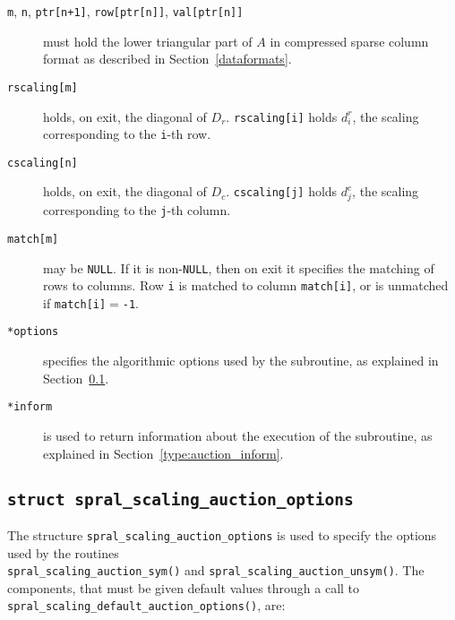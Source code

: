 \begin{description}

\item[\texttt{m}, \texttt{n}, \texttt{ptr[n+1]}, \texttt{row[ptr[n]]}, \texttt{val[ptr[n]]}] must hold the lower triangular part of $A$ in compressed sparse column format as described in Section~\ref{dataformats}.

\item[\texttt{rscaling[m]}] holds, on exit, the diagonal of $D_r$.
\texttt{rscaling[i]} holds $d^r_i$, the scaling corresponding to
the \texttt{i}-th row.

\item[\texttt{cscaling[n]}] holds, on exit, the diagonal of $D_c$.
\texttt{cscaling[j]} holds $d^c_j$, the scaling corresponding to
the \texttt{j}-th column.

\item[\texttt{match[m]}] may be \texttt{NULL}. If it is non-\texttt{NULL},
then on exit it specifies the matching of rows to columns.
Row \texttt{i} is matched to column \texttt{match[i]}, or is unmatched
if \texttt{match[i]}$=$\texttt{-1}.

\item[\texttt{*options}] specifies the algorithmic options used by the subroutine, as explained in Section~\ref{type:auction_options}.

\item[\texttt{*inform}] is used to return information about the execution of the subroutine, as explained in Section~\ref{type:auction_inform}.


\end{description}

\subsection{\texttt{struct spral\_scaling\_auction\_options}} \label{type:auction_options}

The structure \texttt{spral\_scaling\_auction\_options} is used to specify the options
used by the routines \\\texttt{spral\_scaling\_auction\_sym()} and \texttt{spral\_scaling\_auction\_unsym()}. The components, that
must be given default values through a call to \texttt{spral\_scaling\_default\_auction\_options()}, are:

